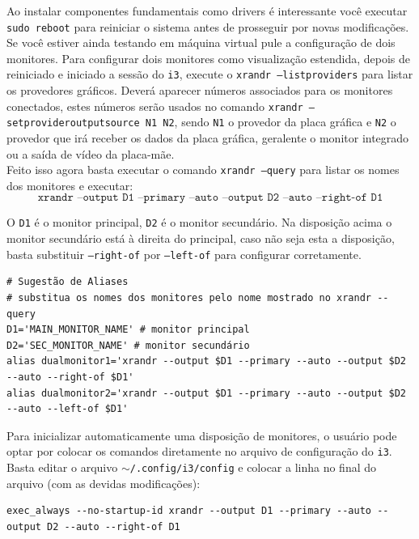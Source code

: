 \documentclass[12pt,a4paper]{article}
\begin{document}
Ao instalar componentes fundamentais como drivers é interessante você executar \texttt{sudo reboot} para reiniciar o sistema antes de prosseguir por novas modificações. \\

Se você estiver ainda testando em máquina virtual pule a configuração de dois monitores. Para configurar dois monitores como visualização estendida, depois de reiniciado e iniciado a sessão do \texttt{i3}, execute o \texttt{xrandr --listproviders} para listar os provedores gráficos. Deverá aparecer números associados para os monitores conectados, estes números serão usados no comando \texttt{xrandr --setprovideroutputsource N1 N2}, sendo \texttt{N1} o provedor da placa gráfica e \texttt{N2} o provedor que irá receber os dados da placa gráfica, geralente o monitor integrado ou a saída de vídeo da placa-mãe.\\

Feito isso agora basta executar o comando \texttt{xrandr --query} para listar os nomes dos monitores e executar:
$$ \texttt{xrandr --output D1 --primary --auto --output D2 --auto --right-of D1} $$

O \texttt{D1} é o monitor principal, \texttt{D2} é o monitor secundário. Na disposição acima o monitor secundário está à direita do principal, caso não seja esta a disposição, basta substituir \texttt{--right-of} por \texttt{--left-of} para configurar corretamente.\\

\begin{lstlisting}
# Sugestão de Aliases
# substitua os nomes dos monitores pelo nome mostrado no xrandr --query
D1='MAIN_MONITOR_NAME' # monitor principal
D2='SEC_MONITOR_NAME' # monitor secundário
alias dualmonitor1='xrandr --output $D1 --primary --auto --output $D2 --auto --right-of $D1'
alias dualmonitor2='xrandr --output $D1 --primary --auto --output $D2 --auto --left-of $D1'
\end{lstlisting}

\vspace{\baselineskip}

Para inicializar automaticamente uma disposição de monitores, o usuário pode optar por colocar os comandos diretamente no arquivo de configuração do \texttt{i3}. Basta editar o arquivo \texttt{$\sim$/.config/i3/config} e colocar a linha no final do arquivo (com as devidas modificações): \\

\begin{lstlisting}
exec_always --no-startup-id xrandr --output D1 --primary --auto --output D2 --auto --right-of D1
\end{lstlisting}
\end{document}
